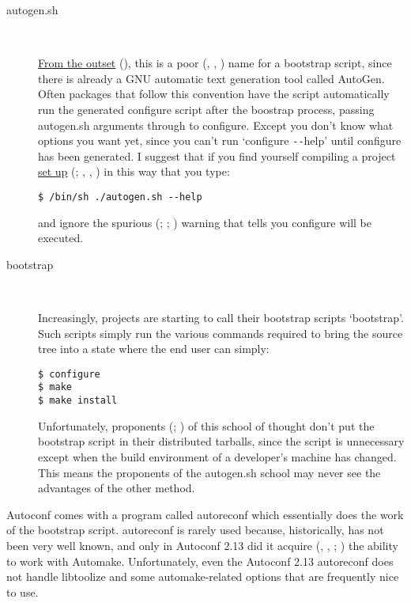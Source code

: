 \begin{description}
\item[autogen.sh]
\ %

\underline{From the outset} ({\McQ{}}), this is a poor ({\MiQ{}}, {\MhQ{}}, {\MaQ{}})
name for a bootstrap script,
since there is already a GNU automatic text generation tool called AutoGen.
Often packages that follow this convention have the script automatically 
run the generated configure script after the boostrap process, passing 
autogen.sh arguments through to configure. Except you don't know what options 
you want yet, since you can't run `configure \verb+--+help' until configure 
has been generated. I suggest that if you find yourself compiling a project 
\underline{set up} ({\MoQ{}}; {\MbQ{}}, {\MbQ{}}, {\MdQ{}}) in this way that you type:

\begin{Verbatim}[frame=single]
$ /bin/sh ./autogen.sh --help
\end{Verbatim}

and ignore the spurious ({\MaQ{}}; {\MdQ{}}; {\MgQ{}}) warning that tells you 
configure will be executed. 

\item[bootstrap]
\ %

Increasingly, projects are starting to call their bootstrap scripts `bootstrap'. Such scripts simply run the various commands required to bring the source tree into a state where the end user can simply:

\begin{Verbatim}[frame=single]
$ configure
$ make
$ make install
\end{Verbatim}

Unfortunately, proponents ({\MbQ{}}; {\MfQ{}}) of this school of thought don't put 
the bootstrap script in their distributed tarballs, since the script is 
unnecessary except when the build environment of a developer's machine 
has changed. This means the proponents of the autogen.sh school may 
never see the advantages of the other method. 
\end{description}

Autoconf comes with a program called autoreconf which essentially does the 
work of the bootstrap script. autoreconf is rarely used because,
historically, has not been very well known, and only in Autoconf 2.13 did 
it acquire ({\MaQ{}}, {\MbQ{}}, {\MaQ{}}; {\MjQ{}}) the ability to work with Automake.
Unfortunately, even the Autoconf 2.13 autoreconf does not handle 
libtoolize and some automake-related options that are frequently nice to use. 


